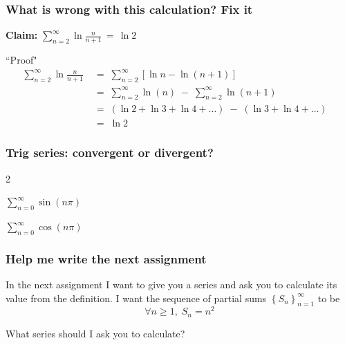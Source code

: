 \begin{frame}[t]
	\fontsize{13}{13}\selectfont
	\frametitle{What is wrong with this calculation? Fix it}

	{\bfseries Claim:} \; $\displaystyle \sum_{n=2}^{\infty}\ln \frac{n}{n+1}\, =\,
	\ln 2$

	\begin{block}{``Proof"}
		\vspace{-.4cm}
		\begin{align*}
			\sum_{n=2}^{\infty}\ln \frac{n}{n+1}\; & = \; \sum_{n=2}^{\infty}\left[ \ln{n}- \ln(n+1) \right]                                             \\
			\;                                     & = \; \sum_{n=2}^{\infty}\ln (n) \; - \; \sum_{n=2}^{\infty}\ln (n+1)                                \\
			\;                                     & = \; \left( \ln 2 + \ln 3 + \ln 4 + \ldots \right) \; - \; ( \ln 3 + \ln 4 + \ldots) \phantom{\int} \\
			\;                                     & = \; \ln 2
		\end{align*}
	\end{block}
\end{frame}

\begin{frame}[t]
	\frametitle{Trig series: convergent or divergent?}

	\begin{enumerate}
	\end{enumerate}
\end{frame}

\begin{frame}[t]
	\frametitle{Help me write the next assignment}

	In the next assignment I want to give you a series and ask you to calculate
	its value from the definition. I want the sequence of partial sums $\displaystyle
	\left\{ S_{n}\right\}_{n=1}^{\infty}$ to be
	\[
		\forall n \geq 1, \; S_{n}= n^{2}
	\]

	What series should I ask you to calculate?
\end{frame}

